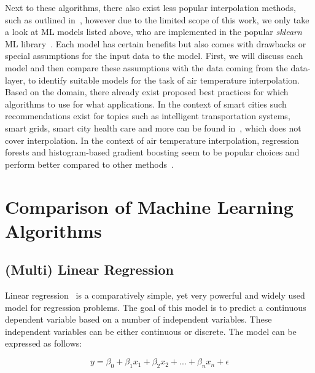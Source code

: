 Next to these algorithms, there also exist less popular interpolation methods, such as outlined in~\cite{li2014spatial}, however due to the limited scope of this work, we only take a look at ML models listed above, who are implemented in the popular \textit{sklearn} ML library~\cite{scikit-learn}.
Each model has certain benefits but also comes with drawbacks or special assumptions for the input data to the model. First, we will discuss each model and then compare these assumptions with the data coming from the data-layer, to identify suitable models for the task of air temperature interpolation.
Based on the domain, there already exist proposed best practices for which algorithms to use for what applications. In the context of smart cities such recommendations exist for topics such as intelligent transportation systems, smart grids, smart city health care and more can be found in~\cite{ullah2020applications}, which does not cover interpolation. In the context of air temperature interpolation, regression forests and histogram-based gradient boosting seem to be popular choices and perform better compared to other methods~\cite{apaydin2022evaluation, ho2014mapping}.

\section{Comparison of Machine Learning Algorithms}
\label{sec:comparison ml algorithms}

\subsection{(Multi) Linear Regression}
\label{subsec: linear regression}

Linear regression~\cite{montgomery2021introduction} is a comparatively simple, yet very powerful and widely used model for regression problems. The goal of this model is to predict a continuous dependent variable based on a number of independent variables. These independent variables can be either continuous or discrete. The model can be expressed as follows:

\begin{equation}
    y = \beta_0 + \beta_1 x_1 + \beta_2 x_2 + ... + \beta_n x_n + \epsilon
\end{equation}

